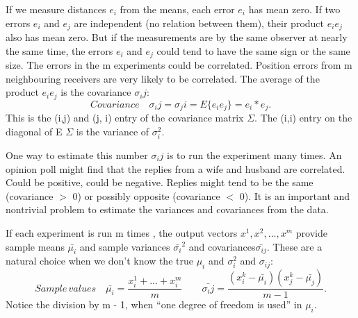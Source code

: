 	If we measure distances $e_i$ from the means, each error $e_i$ has mean zero. If two
	errors $e_i$ and $e_j$ are independent (no relation between them), their product $e_ie_j$ also has
	mean zero. But if the measurements are by the same observer at nearly the same time, the
	errors $e_i$ and $e_j$ could tend to have the same sign or the same size. The errors in the m
	experiments could be correlated. Position errors from m neighbouring receivers are very
	likely to be correlated. The average of the product $e_ie_j$ is the covariance $\sigma_ij$:
	\begin{equation}
	Covariance \quad
	\sigma_ij=\sigma_ji=E\{e_ie_j\}=e_i*e_j.
	\end{equation}
	This is the (i,j) and (j, i) entry of the covariance matrix $\Sigma$. The (i,i) entry on the
	diagonal of E $\Sigma$ is the variance of $\sigma^2_i$.
	
	One way to estimate this number $\sigma_ij$ is to run the experiment many times. An opinion
	poll might find that the replies from a wife and husband are correlated. Could be positive,
	could be negative. Replies might tend to be the same (covariance $>$ 0) or possibly opposite
	(covariance $<$ 0). It is an important and nontrivial problem to estimate the variances and
	covariances from the data.
	
	If each experiment is run m times , the output vectors $x^1,x^2,...,x^m$ provide sample means $\bar{\mu_i}$ and sample variances $\bar{\sigma_i}^2$ and covariances$\bar{\sigma_{ij}}$. These are a natural choice when we don't know the true $\mu_i$ and $\sigma^2_i$ and $\sigma_{ij}$:
	\begin{equation}
	Sample \,values \quad
	\bar{\mu_i}=\frac{x^1_i+...+x^m_i}{m}  \qquad \bar{\sigma_ij}=\frac{(x^k_i-\bar{\mu_i})(x^k_j-\bar{\mu_j})}{m-1}.
	\end{equation} 
	Notice the division by m - 1, when “one degree of freedom is used” in $\mu_i$.
	
